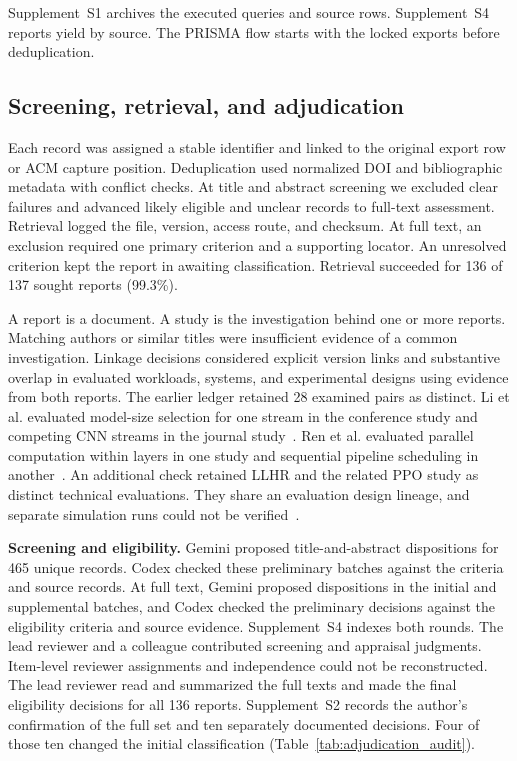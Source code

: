 \documentclass[journal]{IEEEtran}
\begin{document}
Supplement~S1 archives the executed queries and source rows. Supplement~S4 reports yield by source. The PRISMA flow starts with the locked exports before deduplication.

\subsection{Screening, retrieval, and adjudication}
Each record was assigned a stable identifier and linked to the original export row or ACM capture position. Deduplication used normalized DOI and bibliographic metadata with conflict checks. At title and abstract screening we excluded clear failures and advanced likely eligible and unclear records to full-text assessment. Retrieval logged the file, version, access route, and checksum. At full text, an exclusion required one primary criterion and a supporting locator. An unresolved criterion kept the report in awaiting classification. Retrieval succeeded for 136 of 137 sought reports (99.3\%).

A report is a document. A study is the investigation behind one or more reports. Matching authors or similar titles were insufficient evidence of a common investigation. Linkage decisions considered explicit version links and substantive overlap in evaluated workloads, systems, and experimental designs using evidence from both reports. The earlier ledger retained 28 examined pairs as distinct. Li et al. evaluated model-size selection for one stream in the conference study and competing CNN streams in the journal study~\cite{R0003,R0059}. Ren et al. evaluated parallel computation within layers in one study and sequential pipeline scheduling in another~\cite{R0015,R0010}. An additional check retained LLHR and the related PPO study as distinct technical evaluations. They share an evaluation design lineage, and separate simulation runs could not be verified~\cite{R0082,R0019}.

\textbf{Screening and eligibility.} Gemini proposed title-and-abstract dispositions for 465 unique records. Codex checked these preliminary batches against the criteria and source records. At full text, Gemini proposed dispositions in the initial and supplemental batches, and Codex checked the preliminary decisions against the eligibility criteria and source evidence. Supplement~S4 indexes both rounds. The lead reviewer and a colleague contributed screening and appraisal judgments. Item-level reviewer assignments and independence could not be reconstructed. The lead reviewer read and summarized the full texts and made the final eligibility decisions for all 136 reports. Supplement~S2 records the author's confirmation of the full set and ten separately documented decisions. Four of those ten changed the initial classification (Table~\ref{tab:adjudication_audit}).
\end{document}
